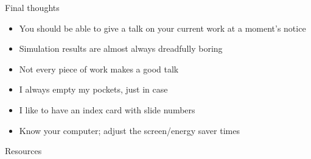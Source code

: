 \documentclass[12pt]{article}
\newcommand{\headsize}{\fontsize{35}{35} \selectfont}
\newcommand{\smallsize}{\fontsize{25}{30} \selectfont}
\newcommand{\smallersize}{\fontsize{20}{25} \selectfont}
\begin{document}
\newpage

\headsize \color{myyellow}
\hfill \begin{minipage}{5.75in}
\centering
Final thoughts
\end{minipage}

\vspace{3cm} \color{mywhite} \smallsize

\hfill \begin{minipage}{9.5in}

\begin{itemize}
\itemsep18pt
\setlength{\rightskip}{0pt plus 1fil} %
\item You should be able to give a talk on your current work at a
  moment's notice

\item Simulation results are almost always dreadfully boring

\item Not every piece of work makes a good talk

\item I always empty my pockets, just in case

\item I like to have an index card with slide numbers

\item Know your computer; adjust the screen/energy saver times


\end{itemize}

\end{minipage}



\newpage

\headsize \color{myyellow}
\hfill \begin{minipage}{5.75in}
\centering
Resources
\end{minipage}

\vspace{15mm} \color{mywhite} \smallersize
\end{document}
